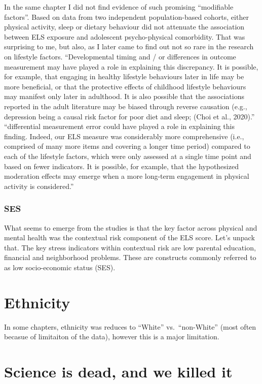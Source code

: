 \documentclass[
  letterpaper,
  DIV=11,
  numbers=noendperiod]{scrreport}
\begin{document}
In the same chapter I did not find evidence of such promising
``modifiable factors''. Based on data from two independent
population-based cohorts, either physical activity, sleep or dietary
behaviour did not attenuate the association between ELS exposure and
adolescent psycho-physical comorbidity. That was surprising to me, but
also, as I later came to find out not so rare in the research on
lifestyle factors. ``Developmental timing and / or differences in
outcome measurement may have played a role in explaining this
discrepancy. It is possible, for example, that engaging in healthy
lifestyle behaviours later in life may be more beneficial, or that the
protective effects of childhood lifestyle behaviours may manifest only
later in adulthood. It is also possible that the associations reported
in the adult literature may be biased through reverse causation (e.g.,
depression being a causal risk factor for poor diet and sleep; (Choi et
al., 2020).'' ``differential measurement error could have played a role
in explaining this finding. Indeed, our ELS measure was considerably
more comprehensive (i.e., comprised of many more items and covering a
longer time period) compared to each of the lifestyle factors, which
were only assessed at a single time point and based on fewer indicators.
It is possible, for example, that the hypothesized moderation effects
may emerge when a more long-term engagement in physical activity is
considered.''

\subsubsection{SES}\label{ses}

What seems to emerge from the studies is that the key factor across
physical and mental health was the contextual risk component of the ELS
score. Let's unpack that. The key stress indicators within contextual
risk are low parental education, financial and neighborhood problems.
These are constructs commonly referred to as low socio-economic status
(SES).

\section{Ethnicity}\label{ethnicity}

In some chapters, ethnicity was reduces to ``White'' vs.~``non-White''
(most often becasue of limitaiton of the data), however this is a major
limitation.

\section{Science is dead, and we killed
it}\label{science-is-dead-and-we-killed-it}
\end{document}
